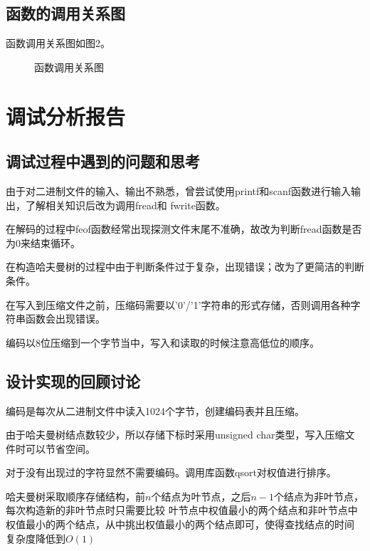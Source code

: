 \documentclass{article}
\begin{document}
\subsection{函数的调用关系图}

函数调用关系图如图2。

\begin{figure}[htbp]


    \caption{函数调用关系图}

\end{figure}

\section{调试分析报告}

\subsection{调试过程中遇到的问题和思考}

由于对二进制文件的输入、输出不熟悉，曾尝试使用printf和scanf函数进行输入输出，了解相关知识后改为调用fread和
fwrite函数。

在解码的过程中feof函数经常出现探测文件末尾不准确，故改为判断fread函数是否为0来结束循环。

在构造哈夫曼树的过程中由于判断条件过于复杂，出现错误；改为了更简洁的判断条件。

在写入到压缩文件之前，压缩码需要以'0'/'1'字符串的形式存储，否则调用各种字符串函数会出现错误。

编码以8位压缩到一个字节当中，写入和读取的时候注意高低位的顺序。

\subsection{设计实现的回顾讨论}

编码是每次从二进制文件中读入1024个字节，创建编码表并且压缩。

由于哈夫曼树结点数较少，所以存储下标时采用unsigned char类型，写入压缩文件时可以节省空间。

对于没有出现过的字符显然不需要编码。调用库函数qsort对权值进行排序。

哈夫曼树采取顺序存储结构，前$n$个结点为叶节点，之后$n-1$个结点为非叶节点，每次构造新的非叶节点时只需要比较
叶节点中权值最小的两个结点和非叶节点中权值最小的两个结点，从中挑出权值最小的两个结点即可，使得查找结点的时间
复杂度降低到$O(1)$
\end{document}

